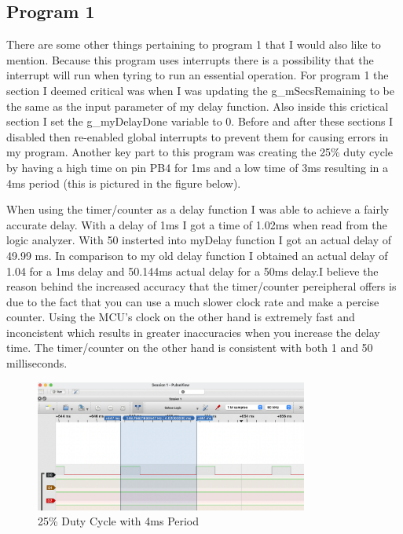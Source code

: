 \documentclass[11pt,pdftex,portrait,letterpaper]{article}
\begin{document}
	
	\subsection{Program 1}

	There are some other things pertaining to program 1 that I would also like to mention. Because this program uses interrupts there is a possibility that the interrupt will run when tyring to run an essential operation. For program 1 the section I deemed critical was when I was updating the g\_mSecsRemaining to be the same as the input parameter of my delay function. Also inside this crictical section I set the g\_myDelayDone variable to 0. Before and after these sections I disabled then re-enabled global interrupts to prevent them for causing errors in my program. Another key part to this program was creating the 25\% duty cycle by having a high time on pin PB4 for 1ms and a low time of 3ms resulting in a 4ms period (this is pictured in the figure below). 
	
	When using the timer/counter as a delay function I was able to achieve a fairly accurate delay. With a delay of 1ms I got a time of 1.02ms when read from the logic analyzer. With 50 insterted into myDelay function I got an actual delay of 49.99 ms. In comparison to my old delay function I obtained an actual delay of 1.04 for a 1ms delay and 50.144ms actual delay for a 50ms delay.I believe the reason behind the increased accuracy that the timer/counter pereipheral offers is due to the fact that you can use a much slower clock rate and make a percise counter. Using the MCU's clock on the other hand is extremely fast and inconcistent which results in greater inaccuracies when you increase the delay time. The timer/counter on the other hand is consistent with both 1 and 50 milliseconds.
	
	
	\begin{figure}[h]
		\centering
		\includegraphics[width=0.80\textwidth]{./proj4_1ms}	%
		\caption{25\% Duty Cycle with 4ms Period}
		\label{f:fig1}	%
	\end{figure}
	
\end{document}
